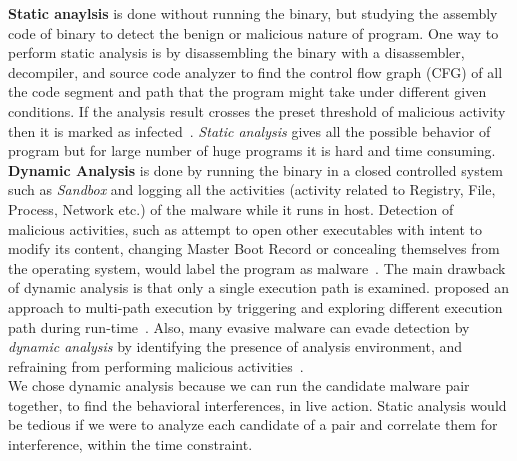 \textbf{Static anaylsis} is done without running the binary, but studying the assembly code of binary to detect the benign or malicious nature of program.
One way to perform static analysis is by disassembling the binary with a disassembler, decompiler, and source code analyzer to find the control flow graph (CFG) of all the code segment and path that the program might take under different given conditions.
If the analysis result crosses the preset threshold of malicious activity then it is marked as infected~\cite[]{sharma2014}.
\emph{Static analysis} gives all the possible behavior of program but for large number of huge programs it is hard and time consuming.\\

\textbf{Dynamic Analysis} is done by running the binary in a closed controlled system such as \emph{Sandbox} and logging all the activities (activity related to Registry, File, Process, Network etc.) of the malware while it runs in host.
Detection of malicious activities, such as attempt to open other executables with intent to modify its content, changing Master Boot Record or concealing themselves from the operating system, would label the program as malware~\cite[]{sharma2014}.
The main drawback of dynamic analysis is that only a single execution path is examined.
\citeauthor{chipounov2012s2e} proposed an approach to multi-path execution by triggering and exploring different execution path during run-time~\cite[]{chipounov2012s2e}.
Also, many evasive malware can evade detection by \emph{dynamic analysis} by identifying the presence of analysis environment, and refraining from performing malicious activities~\cite[]{barecloud}.
\\

We chose dynamic analysis because we can run the candidate malware pair together, to find the behavioral interferences, in live action.
Static analysis would be tedious if we were to analyze each candidate of a pair and correlate them for interference, within the time constraint.
